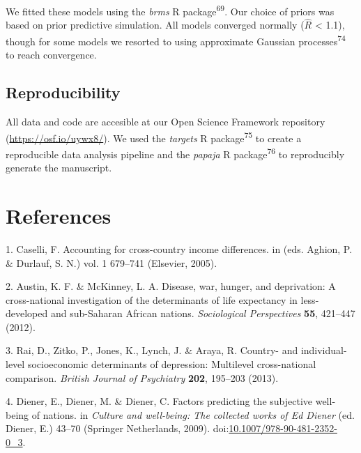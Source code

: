 \documentclass[english,man,floatsintext]{apa6}
\begin{document}
We fitted these models using the \emph{brms} R package\textsuperscript{69}. Our choice of priors was based on prior predictive simulation. All models converged normally (\(\hat{R}\) \textless{} 1.1), though for some models we resorted to using approximate Gaussian processes\textsuperscript{74} to reach convergence.

\hypertarget{reproducibility}{%
\subsection{Reproducibility}\label{reproducibility}}

All data and code are accesible at our Open Science Framework repository (\url{https://osf.io/uywx8/}). We used the \emph{targets} R package\textsuperscript{75} to create a reproducible data analysis pipeline and the \emph{papaja} R package\textsuperscript{76} to reproducibly generate the manuscript.

\newpage

\hypertarget{references}{%
\section{References}\label{references}}

\begingroup
\setlength{\parindent}{-0.5in}
\setlength{\leftskip}{0.5in}

\hypertarget{refs}{}
\leavevmode\hypertarget{ref-Caselli2005}{}%
1. Caselli, F. Accounting for cross-country income differences. in (eds. Aghion, P. \& Durlauf, S. N.) vol. 1 679--741 (Elsevier, 2005).

\leavevmode\hypertarget{ref-Austin2012}{}%
2. Austin, K. F. \& McKinney, L. A. Disease, war, hunger, and deprivation: A cross-national investigation of the determinants of life expectancy in less-developed and sub-Saharan African nations. \emph{Sociological Perspectives} \textbf{55}, 421--447 (2012).

\leavevmode\hypertarget{ref-Rai2013}{}%
3. Rai, D., Zitko, P., Jones, K., Lynch, J. \& Araya, R. Country- and individual-level socioeconomic determinants of depression: Multilevel cross-national comparison. \emph{British Journal of Psychiatry} \textbf{202}, 195--203 (2013).

\leavevmode\hypertarget{ref-Diener2009}{}%
4. Diener, E., Diener, M. \& Diener, C. Factors predicting the subjective well-being of nations. in \emph{Culture and well-being: The collected works of Ed Diener} (ed. Diener, E.) 43--70 (Springer Netherlands, 2009). doi:\href{https://doi.org/10.1007/978-90-481-2352-0_3}{10.1007/978-90-481-2352-0\_3}.
\end{document}
